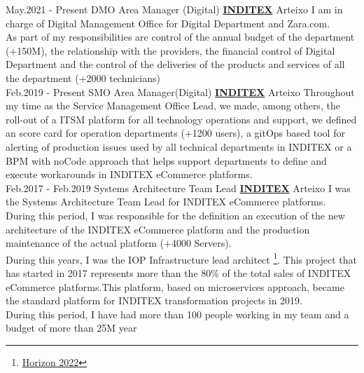 \documentclass[a4paper]{twentysecondcv} %
\begin{document}
\begin{twenty} %
\twentyitem
    	{May.2021 -}
		{Present}
        {DMO Area Manager (Digital)}
        {\href{https://www.inditex.com/}{\textbf{INDITEX}}}
        {Arteixo}
        {
        I am in charge of Digital Management Office for Digital Department and Zara.com. \\
        As part of my responsibilities are control of the annual budget of the department (+150M), the relationship with the providers, the financial control of Digital Department and the control of the deliveries of the products and services of all the department (+2000 technicians)
        }
        \\
\twentyitem
    	{Feb.2019 -}
		{Present}
        {SMO Area Manager(Digital)}
        {\href{https://www.inditex.com/}{\textbf{INDITEX}}}
        {Arteixo}
        {
        Throughout my time as the Service Management Office Lead, we made, among others, the roll-out of a ITSM platform for all technology operations and support, we defined an score card for operation departments (+1200 users), a gitOps based tool for alerting of production issues used by all technical departments in INDITEX or a BPM with noCode approach that helps support departments to define and execute workarounds in INDITEX eCommerce platforms.
        }
        \\
\twentyitem
    	{Feb.2017 -}
		{Feb.2019}
        {Systems Architecture Team Lead}
        {\href{https://www.inditex.com/}{\textbf{INDITEX}}}
        {Arteixo}
        {
        I was the Systems Architecture Team Lead for INDITEX eCommerce platforms. During this period, I was responsible for the definition an execution of the new architecture of the INDITEX eCommerce platform and the production maintenance of the actual platform (+4000 Servers).\\ 
        During this years, I was the IOP Infrastructure lead architect \footnote{\href {https://www.inditex.com/documents/10279/304402/2022+Horizon_eng.pdf/0c482bbd-692e-1346-5af5-0c6bf1c5e02f}{Horizon 2022}}. This project that has started in 2017 represents more than the 80\% of the total sales of INDITEX eCommerce platforms.This platform, based on microservices approach, became the standard platform for INDITEX transformation projects in 2019.\\
        During this period, I have had more than 100 people working in my team and a budget of more than 25M year
        }
        \\
\twentyitem

\end{twenty}
\end{document}

